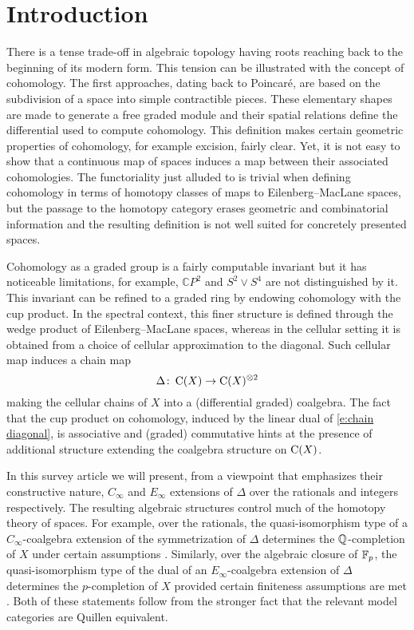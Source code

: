 
\section{Introduction} \label{s:introduction}

There is a tense trade-off in algebraic topology having roots reaching back to the beginning of its modern form.
This tension can be illustrated with the concept of cohomology.
The first approaches, dating back to Poincar\'e, are based on the subdivision of a space into simple contractible pieces.
These elementary shapes are made to generate a free graded module and their spatial relations define the differential used to compute cohomology.
This definition makes certain geometric properties of cohomology, for example excision, fairly clear.
Yet, it is not easy to show that a continuous map of spaces induces a map between their associated cohomologies.
The functoriality just alluded to is trivial when defining cohomology in terms of homotopy classes of maps to Eilenberg--MacLane spaces, but the passage to the homotopy category erases geometric and combinatorial information and the resulting definition is not well suited for concretely presented spaces.

Cohomology as a graded group is a fairly computable invariant but it has noticeable limitations, for example, $\mathbb{C} P^2$ and $S^2 \vee S^4$ are not distinguished by it.
This invariant can be refined to a graded ring by endowing cohomology with the cup product.
In the spectral context, this finer structure is defined through the wedge product of Eilenberg--MacLane spaces, whereas in the cellular setting it is obtained from a choice of
cellular approximation to the diagonal.
Such cellular map induces a chain map
\begin{equation} \label{e:chain diagonal}
\Delta \colon \operatorname{C}(X) \to \operatorname{C}(X)^{\otimes 2}
\end{equation}
making the cellular chains of $X$ into a (differential graded) coalgebra.
The fact that the cup product on cohomology, induced by the linear dual of \eqref{e:chain diagonal}, is associative and (graded) commutative hints at the presence of additional structure extending the coalgebra structure on $\operatorname{C}(X)$.

In this survey article we will present, from a viewpoint that emphasizes their constructive nature, $C_\infty$ and $E_\infty$ extensions of $\Delta$ over the rationals and integers respectively.
The resulting algebraic structures control much of the homotopy theory of spaces.
For example, over the rationals, the quasi-isomorphism type of a $C_\infty$-coalgebra extension of the symmetrization of $\Delta$ determines the $\mathbb{Q}$-completion of $X$ under certain assumptions \cite{quillen1969rational, buijs2020liemodels}.
Similarly, over the algebraic closure of ${\mathbb{F}_p}$, the quasi-isomorphism type of the dual of an $E_\infty$-coalgebra extension of $\Delta$ determines the $p$-completion of $X$ provided certain finiteness assumptions are met \cite{mandell2001padic}.
Both of these statements follow from the stronger fact that the relevant model categories are Quillen equivalent.

